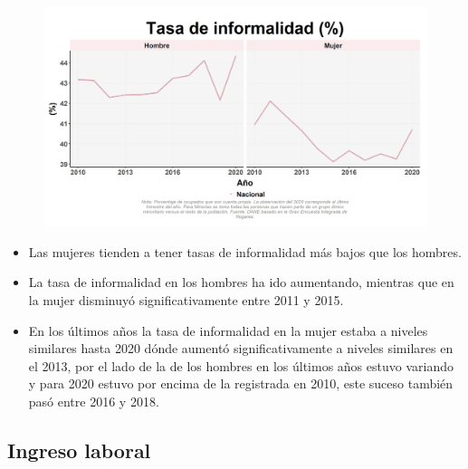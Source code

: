     \begin{figure}[H]
        \caption[Tasa de informalidad por género ]{\label{informal_gen_trend} }
        \begin{center}
        \includegraphics[width=\textwidth,keepaspectratio]{img/var_69_trend.png}
        \end{center}
    \end{figure}
            \begin{itemize}
                \item Las mujeres tienden a tener tasas de informalidad más bajos que los hombres.
                \item La tasa de informalidad en los hombres ha ido aumentando, mientras que en la mujer disminuyó significativamente entre 2011 y 2015.
                \item En los últimos años la tasa de informalidad en la mujer estaba a niveles similares hasta 2020 dónde aumentó significativamente a niveles similares en el 2013, por el lado de la de los hombres en los últimos años estuvo variando y para 2020 estuvo por encima de la registrada en 2010, este suceso también pasó entre 2016 y 2018.
                \end{itemize}

    \subsection{Ingreso laboral}


